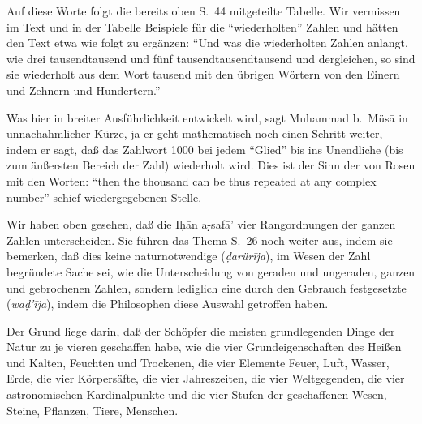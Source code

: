 \documentclass[11pt,a4paper]{article}
\newcommand{\s}[1]{\d{#1}}     %
\newcommand{\hw}{\d{h}}       %
\newcommand{\enquote}[1]{``#1''}
\begin{document}
Auf diese Worte folgt die bereits oben S.\ 44 mitgeteilte Tabelle. Wir vermissen im Text und in der Tabelle Beispiele f\"ur die \enquote{wiederholten} Zahlen und h\"atten den Text etwa wie folgt zu erg\"anzen: \enquote{Und was die wiederholten Zahlen anlangt, wie drei tausendtausend und f\"unf tausendtausendtausend und dergleichen, so sind sie wiederholt aus dem Wort tausend mit den \"ubrigen W\"ortern von den Einern und Zehnern und Hundertern.}

Was hier in breiter Ausf\"uhrlichkeit entwickelt wird, sagt Muhammad b.\ M\"us\=a in unnachahmlicher K\"urze, ja er geht mathematisch noch einen Schritt weiter, indem er sagt, da\ss{} das Zahlwort 1000 bei jedem \enquote{Glied} bis ins Unendliche (bis zum \"au\ss{}ersten Bereich der Zahl) wiederholt wird. Dies ist der Sinn der von Rosen mit den Worten: \enquote{then the thousand can be thus repeated at any complex number} schief wiedergegebenen Stelle.

Wir haben oben gesehen, da\ss{} die I\hw{}\=an a\s-s{}af\=a' vier Rangordnungen der ganzen Zahlen unterscheiden. Sie f\"uhren das Thema S.\ 26 noch weiter aus, indem sie bemerken, da\ss{} dies keine naturnotwendige (\textit{\d{d}ar\"ur\={i}ja}), im Wesen der Zahl begr\"undete Sache sei, wie die Unterscheidung von geraden und ungeraden, ganzen und gebrochenen Zahlen, sondern lediglich eine durch den Gebrauch festgesetzte (\textit{wa\d{d}'\={i}ja}), indem die Philosophen diese Auswahl getroffen haben.

Der Grund liege darin, da\ss{} der Sch\"opfer die meisten grundlegenden Dinge der Natur zu je vieren geschaffen habe, wie die vier Grundeigenschaften des Hei\ss{}en und Kalten, Feuchten und Trockenen, die vier Elemente Feuer, Luft, Wasser, Erde, die vier K\"orpers\"afte, die vier Jahreszeiten, die vier Weltgegenden, die vier astronomischen Kardinalpunkte und die vier Stufen der geschaffenen Wesen, Steine, Pflanzen, Tiere, Menschen.
\end{document}
